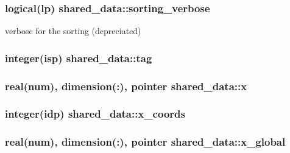 \subsubsection[{\texorpdfstring{sorting\+\_\+verbose}{sorting_verbose}}]{\setlength{\rightskip}{0pt plus 5cm}logical(lp) shared\+\_\+data\+::sorting\+\_\+verbose}\hypertarget{namespaceshared__data_a3967a61950e8f0c86d9ecd322e3d05ec}{}\label{namespaceshared__data_a3967a61950e8f0c86d9ecd322e3d05ec}


verbose for the sorting (depreciated) 

\subsubsection[{\texorpdfstring{tag}{tag}}]{\setlength{\rightskip}{0pt plus 5cm}integer(isp) shared\+\_\+data\+::tag}\hypertarget{namespaceshared__data_a7877a929286571631efc41c30444e7cd}{}\label{namespaceshared__data_a7877a929286571631efc41c30444e7cd}
\subsubsection[{\texorpdfstring{x}{x}}]{\setlength{\rightskip}{0pt plus 5cm}real(num), dimension(\+:), pointer shared\+\_\+data\+::x}\hypertarget{namespaceshared__data_a5a1b9ce71c6bcfbe478783cc7a5e4d7d}{}\label{namespaceshared__data_a5a1b9ce71c6bcfbe478783cc7a5e4d7d}
\subsubsection[{\texorpdfstring{x\+\_\+coords}{x_coords}}]{\setlength{\rightskip}{0pt plus 5cm}integer(idp) shared\+\_\+data\+::x\+\_\+coords}\hypertarget{namespaceshared__data_ad2930b2e73ee090643c12e9cb17176ec}{}\label{namespaceshared__data_ad2930b2e73ee090643c12e9cb17176ec}
\subsubsection[{\texorpdfstring{x\+\_\+global}{x_global}}]{\setlength{\rightskip}{0pt plus 5cm}real(num), dimension(\+:), pointer shared\+\_\+data\+::x\+\_\+global}\hypertarget{namespaceshared__data_a103bc2f0564094768f3a34476b371d3a}{}\label{namespaceshared__data_a103bc2f0564094768f3a34476b371d3a}
